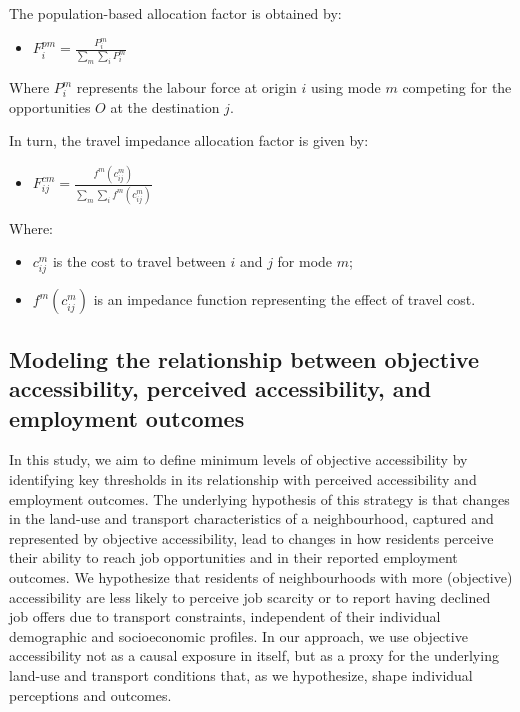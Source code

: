 \documentclass[preprint, 3p,
authoryear]{elsarticle} %
\providecommand{\tightlist}{%
  \setlength{\itemsep}{0pt}\setlength{\parskip}{0pt}}
\begin{document}
The population-based allocation factor is obtained by:

\begin{itemize}
\tightlist
\item
  \(F^{pm}_{i} = \frac{P_{i}^m}{\sum_{m}\sum_{i} P_{i}^m}\)
\end{itemize}

Where \(P_{i}^m\) represents the labour force at origin \(i\) using mode
\(m\) competing for the opportunities \(O\) at the destination \(j\).

In turn, the travel impedance allocation factor is given by:

\begin{itemize}
\tightlist
\item
  \(F_{ij}^{cm} = \frac{f^m(c_{ij}^m)}{\sum_{m} \sum_{i} f^m(c_{ij}^m)}\)
\end{itemize}

Where:

\begin{itemize}
\tightlist
\item
  \(c^m_{ij}\) is the cost to travel between \(i\) and \(j\) for mode
  \(m\);
\item
  \(f^m(c^m_{ij})\) is an impedance function representing the effect of
  travel cost.
\end{itemize}

\subsection{Modeling the relationship between objective accessibility,
perceived accessibility, and employment
outcomes}\label{modeling-the-relationship-between-objective-accessibility-perceived-accessibility-and-employment-outcomes}

In this study, we aim to define minimum levels of objective
accessibility by identifying key thresholds in its relationship with
perceived accessibility and employment outcomes. The underlying
hypothesis of this strategy is that changes in the land-use and
transport characteristics of a neighbourhood, captured and represented
by objective accessibility, lead to changes in how residents perceive
their ability to reach job opportunities and in their reported
employment outcomes. We hypothesize that residents of neighbourhoods
with more (objective) accessibility are less likely to perceive job
scarcity or to report having declined job offers due to transport
constraints, independent of their individual demographic and
socioeconomic profiles. In our approach, we use objective accessibility
not as a causal exposure in itself, but as a proxy for the underlying
land-use and transport conditions that, as we hypothesize, shape
individual perceptions and outcomes.
\end{document}
